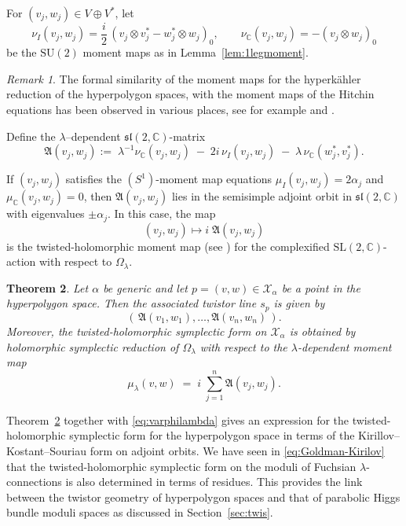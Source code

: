 \documentclass[12pt,a4paper]{amsart}
\newtheorem{theorem}{Theorem}[section]
\theoremstyle{definition}
\theoremstyle{remark}
\newtheorem{remark}[theorem]{Remark}
\newcommand{\C}{\mathbb C}
\begin{document}
For $(v_j,w_j)\in V\oplus V^*$, let
\[
\nu_I(v_j,w_j)=\frac{i}{2}\,(v_j\otimes v_j^* - w_j^*\otimes w_j)_0,\qquad
\nu_\C(v_j,w_j)=-(v_j\otimes w_j)_0
\]
be the $\mathrm{SU}(2)$ moment maps as in Lemma~\ref{lem:1legmoment}.  
\begin{remark}\label{rem:momentt0}
The formal similarity  of the moment maps for the hyperk\"ahler reduction of the hyperpolygon spaces, with the moment maps
of the Hitchin equations has been observed in various places, see for example \cite{BiquardMinerbe} and \cite{RS21}.
\end{remark}


Define the $\lambda$--dependent $\mathfrak{sl}(2, \mathbb C)$-matrix
\begin{equation}\label{eq:mafraA}
\mathfrak A(v_j,w_j):=\;\lambda^{-1}\nu_\C(v_j,w_j)\;-\;2i\,\nu_I(v_j,w_j)\;-\;\lambda\,\nu_\C(w_j^*,v_j^*).
\end{equation}

If $(v_j,w_j)$ satisfies the $(S^1)$-moment map equations
$\mu_I(v_j,w_j)=2\alpha_j$ and $\mu_\C(v_j,w_j)=0$, then
$\mathfrak A(v_j,w_j)$ lies in the semisimple adjoint orbit in
$\mathfrak{sl}(2,\C)$ with eigenvalues $\pm\alpha_j$.
In this case, the map
\[(v_j,w_j)\mapsto i\;\mathfrak A(v_j,w_j)\]
is the twisted-holomorphic moment map (see \cite[Section 3 (F)]{HKLR}) for the complexified
$\mathrm{SL}(2,\C)$-action with respect to $\Omega_\lambda$.




\begin{theorem}\label{thm:twistor-hyperpolygon-orbits}
Let $\alpha$ be generic and let $p=(v,w)\in\mathcal X_\alpha$ be a point in the
hyperpolygon space.
Then the associated twistor line $s_p$ is given by
\[(\,\mathfrak A(v_1,w_1),\dots,\mathfrak A(v_n,w_n)\,).\] 
Moreover, the twisted-holomorphic symplectic form
 on $\mathcal X_\alpha$ is obtained by
holomorphic symplectic reduction of $\Omega_\lambda$ with respect to the
$\lambda$-dependent moment map
\[
\mu_\lambda(v,w)\;=\; i\;\sum_{j=1}^n \mathfrak A(v_j,w_j).\]
\end{theorem}


Theorem~\ref{thm:twistor-hyperpolygon-orbits} together with 
\eqref{eq:varphilambda}  gives an expression for the twisted-holomorphic symplectic form 
for the hyperpolygon space
 in terms of the Kirillov--Kostant--Souriau form on adjoint orbits.
We have seen in \eqref{eq:Goldman-Kirilov}  that
 the twisted-holomorphic symplectic form 
 on  the moduli of Fuchsian $\lambda$-connections
 is also determined in terms of residues.
This 
provides the link between the twistor geometry of hyperpolygon spaces and that of
parabolic Higgs bundle moduli spaces as discussed in Section~\ref{sec:twis}.
\end{document}
